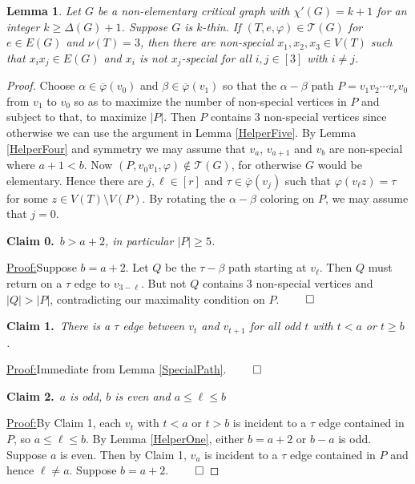 \documentclass[12pt]{amsart}
\theoremstyle{plain}
\newtheorem{lem}[thm]{Lemma}
\theoremstyle{definition}
\theoremstyle{remark}
\newcommand{\fancy}[1]{\mathcal{#1}}
\newcommand{\T}{\fancy{T}}
\newcommand{\irange}[1]{\left[#1\right]}
\newcommand{\vph}{\varphi}
\newcommand{\vphn}{\overline{\varphi}}
\newcommand{\claim}[2]{{\noindent\bf Claim #1.}~{\it #2}~~}
\newenvironment{claimproof}[1]{\par\noindent\underline{Proof:}\space#1}{\leavevmode\unskip\penalty9999
\hbox{}\nobreak\hfill\quad\hbox{$\qed$}}
\begin{document}
\begin{lem}\label{HelperSix}
Let $G$ be a non-elementary critical graph with $\chi'(G) = k+1$ for an integer $k \ge \Delta(G) + 1$.
Suppose $G$ is $k$-thin. If $(T, e, \vph) \in \T(G)$ for $e \in E(G)$ and $\nu(T) = 3$, then there are non-special $x_1,x_2,x_3 \in V(T)$ such that $x_ix_j \in E(G)$ and $x_i$ 
is not $x_j$-special for all $i,j \in \irange{3}$ with $i \ne j$.
\end{lem}
\begin{proof}
Choose $\alpha \in \vphn(v_0)$ and $\beta \in \vphn(v_1)$ so that the $\alpha-\beta$ path $P = v_1v_2\cdots v_rv_0$ from $v_1$ to $v_0$ so as to maximize the number of non-special vertices in $P$ and subject to that,
to maximize $|P|$.  Then $P$ contains $3$ non-special vertices since otherwise we can use the argument in Lemma \ref{HelperFive}.  By Lemma \ref{HelperFour} and symmetry we may assume that $v_a$, $v_{a+1}$ and $v_b$ are non-special where $a+1 < b$.
Now $(P, v_0v_1, \vph) \not \in \T(G)$, for otherwise $G$ would be elementary.  Hence there are $j,\ell \in \irange{r}$ and $\tau \in \vphn(v_j)$ such that $\vph(v_\ell z) = \tau$ for some $z \in V(T) \setminus V(P)$.
By rotating the $\alpha-\beta$ coloring on $P$, we may assume that $j=0$.

\claim{0}{$b > a+2$, in particular $|P| \ge 5$.}

\begin{claimproof}
Suppose $b = a+2$. Let $Q$ be the $\tau-\beta$ path starting at $v_\ell$.  Then $Q$ must return on a $\tau$ edge to $v_{3-\ell}$. 
But not $Q$ contains $3$ non-special vertices and $|Q| > |P|$, contradicting our maximality condition on $P$.
\end{claimproof}

\claim{1}{There is a $\tau$ edge between $v_{t}$ and $v_{t+1}$ for all odd $t$ with $t < a$ or $t \ge b$.}

\begin{claimproof}
Immediate from Lemma \ref{SpecialPath}.
\end{claimproof}

\claim{2}{$a$ is odd, $b$ is even and $a \le \ell \le b$}

\begin{claimproof}
By Claim 1, each $v_t$ with $t < a$ or $t > b$ is incident to a $\tau$ edge contained in $P$, so $a \le \ell \le b$.  By Lemma \ref{HelperOne}, either $b = a+2$ or $b-a$ is odd.
Suppose $a$ is even.  Then by Claim 1, $v_a$ is incident to a $\tau$ edge contained in $P$ and hence $\ell \ne a$.  Suppose $b = a+2$.
\end{claimproof}




\end{proof}
\end{document}
